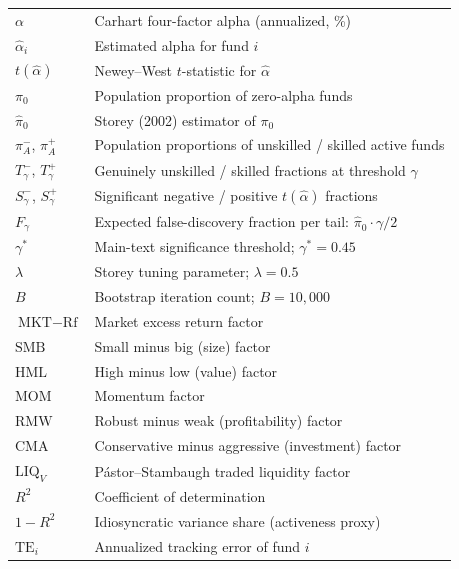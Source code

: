\documentclass[12pt, oneside]{report}
\newif\ifsbeplainlist   %
\begin{document}
\sbeplainlisttrue
\begin{longtable}{@{}ll@{}}
\endhead
$\alpha$                       & Carhart four-factor alpha (annualized, \%) \\
$\hat{\alpha}_i$                & Estimated alpha for fund $i$ \\
$t(\hat{\alpha})$               & Newey--West $t$-statistic for $\hat{\alpha}$ \\
$\pi_0$                         & Population proportion of zero-alpha funds \\
$\hat{\pi}_0$                   & Storey (2002) estimator of $\pi_0$ \\
$\pi^-_A$, $\pi^+_A$            & Population proportions of unskilled / skilled active funds \\
$T^-_\gamma$, $T^+_\gamma$      & Genuinely unskilled / skilled fractions at threshold $\gamma$ \\
$S^-_\gamma$, $S^+_\gamma$      & Significant negative / positive $t(\hat{\alpha})$ fractions \\
$F_\gamma$                      & Expected false-discovery fraction per tail: $\hat{\pi}_0 \cdot \gamma / 2$ \\
$\gamma^*$                      & Main-text significance threshold; $\gamma^* = 0.45$ \\
$\lambda$                       & Storey tuning parameter; $\lambda = 0.5$ \\
$B$                             & Bootstrap iteration count; $B = 10{,}000$ \\
$\text{MKT}-\text{Rf}$      & Market excess return factor \\
$\text{SMB}$                  & Small minus big (size) factor \\
$\text{HML}$                  & High minus low (value) factor \\
$\text{MOM}$                  & Momentum factor \\
$\text{RMW}$                  & Robust minus weak (profitability) factor \\
$\text{CMA}$                  & Conservative minus aggressive (investment) factor \\
$\text{LIQ}_V$                & Pástor--Stambaugh traded liquidity factor \\
$R^2$                           & Coefficient of determination \\
$1-R^2$                         & Idiosyncratic variance share (activeness proxy) \\
$\text{TE}_i$                 & Annualized tracking error of fund $i$ \\

\end{longtable}
\end{document}
